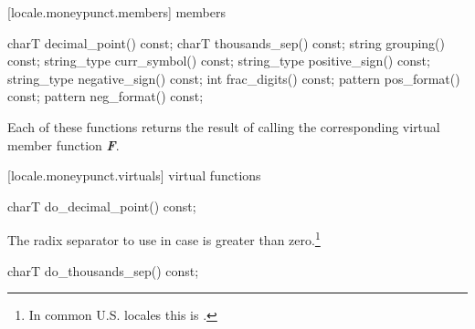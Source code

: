 [locale.moneypunct.members]{ members}

%
%
%
%
%
%
%
%
%
%
%
%
%
%
%
%
%
%
\begin{codeblock}
charT        decimal_point() const;
charT        thousands_sep() const;
string       grouping()      const;
string_type  curr_symbol()   const;
string_type  positive_sign() const;
string_type  negative_sign() const;
int          frac_digits()   const;
pattern      pos_format()    const;
pattern      neg_format()    const;
\end{codeblock}

\pnum
Each of these functions 
returns the result of calling the corresponding
virtual member function
\textbf\textit{{F}}\tcode{()}.

[locale.moneypunct.virtuals]{ virtual functions}

%
%
\begin{itemdecl}
charT do_decimal_point() const;
\end{itemdecl}

\begin{itemdescr}
\pnum
\returns
The radix separator to use in case
is greater than zero.\footnote{In common U.S. locales this is
.}
\end{itemdescr}

%
%
\begin{itemdecl}
charT do_thousands_sep() const;
\end{itemdecl}

